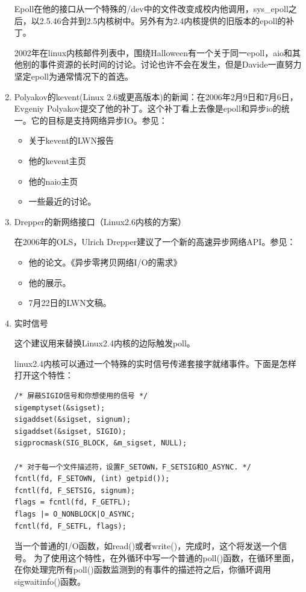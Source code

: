 \documentclass[twoside, xetex]{report}
\begin{document}
\begin{enumerate}
	Epoll在他的接口从一个特殊的/dev中的文件改变成校内他调用，sys\_epoll之后，以2.5.46合并到2.5内核树中。另外有为2.4内核提供的旧版本的epoll的补丁。
	
	2002年在linux内核邮件列表中，围绕Halloween有一个关于同一epoll，aio和其他别的事件资源的长时间的讨论。讨论也许不会在发生，但是Davide一直努力坚定epoll为通常情况下的首选。

	\item Polyakov的kevent(Linux 2.6或更高版本)的新闻：在2006年2月9日和7月6日，Evgeniy Polyakov提交了他的补丁。这个补丁看上去像是epoll和异步io的统一。它的目标是支持网络异步IO。参见：
	\begin{itemize}
		\item 关于kevent的LWN报告
		\item 他的kevent主页
		\item 他的naio主页
		\item 一些最近的讨论。
	\end{itemize}
	
	\item Drepper的新网络接口（Linux2.6内核的方案）

		在2006年的OLS，Ulrich Drepper建议了一个新的高速异步网络API。参见：
	\begin{itemize}
		\item 他的论文。《异步零拷贝网络I/O的需求》
		\item 他的展示。
		\item 7月22日的LWN文稿。
	\end{itemize}

	\item 实时信号

		这个建议用来替换Linux2.4内核的边际触发poll。

		linux2.4内核可以通过一个特殊的实时信号传递套接字就绪事件。下面是怎样打开这个特性：

		\begin{verbatim}
/* 屏蔽SIGIO信号和你想使用的信号 */
sigemptyset(&sigset);
sigaddset(&sigset, signum);
sigaddset(&sigset, SIGIO);
sigprocmask(SIG_BLOCK, &m_sigset, NULL);

/* 对于每一个文件描述符，设置F_SETOWN，F_SETSIG和O_ASYNC. */
fcntl(fd, F_SETOWN, (int) getpid());
fcntl(fd, F_SETSIG, signum);
flags = fcntl(fd, F_GETFL);
flags |= O_NONBLOCK|O_ASYNC;
fcntl(fd, F_SETFL, flags);
		\end{verbatim}
		
		当一个普通的I/O函数，如read()或者write()，完成时，这个将发送一个信号。
为了使用这个特性，在外循环中写一个普通的poll()函数，在循环里面，在你处理完所有poll()函数监测到的有事件的描述符之后，你循环调用sigwaitinfo()函数。


\end{enumerate}
\end{document}
